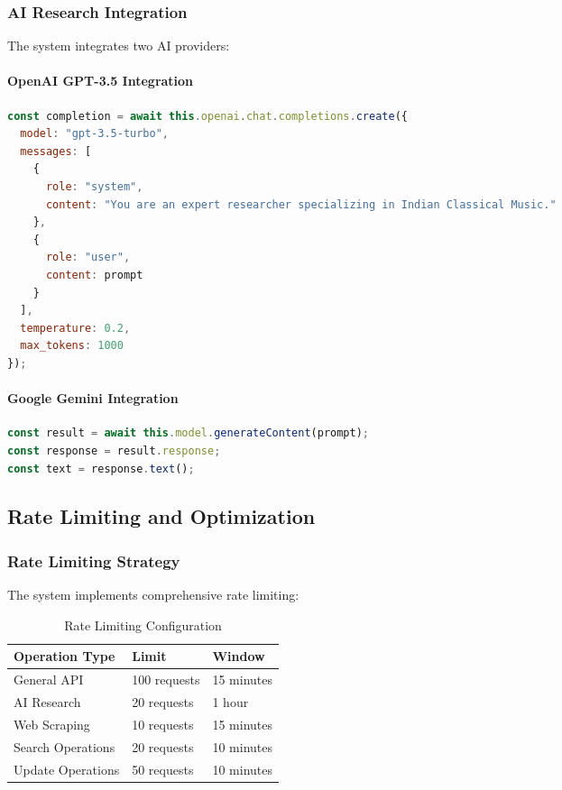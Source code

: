 \documentclass[12pt,a4paper]{article}
\begin{document}
\subsubsection{AI Research Integration}

The system integrates two AI providers:

\paragraph{OpenAI GPT-3.5 Integration}
\begin{lstlisting}[language=JavaScript]
const completion = await this.openai.chat.completions.create({
  model: "gpt-3.5-turbo",
  messages: [
    {
      role: "system",
      content: "You are an expert researcher specializing in Indian Classical Music."
    },
    {
      role: "user",
      content: prompt
    }
  ],
  temperature: 0.2,
  max_tokens: 1000
});
\end{lstlisting}

\paragraph{Google Gemini Integration}
\begin{lstlisting}[language=JavaScript]
const result = await this.model.generateContent(prompt);
const response = result.response;
const text = response.text();
\end{lstlisting}

\subsection{Rate Limiting and Optimization}

\subsubsection{Rate Limiting Strategy}

The system implements comprehensive rate limiting:

\begin{table}[H]
\centering
\begin{tabular}{|l|l|l|}
\hline
\textbf{Operation Type} & \textbf{Limit} & \textbf{Window} \\
\hline
General API & 100 requests & 15 minutes \\
AI Research & 20 requests & 1 hour \\
Web Scraping & 10 requests & 15 minutes \\
Search Operations & 20 requests & 10 minutes \\
Update Operations & 50 requests & 10 minutes \\
\hline
\end{tabular}
\caption{Rate Limiting Configuration}
\end{table}
\end{document}
